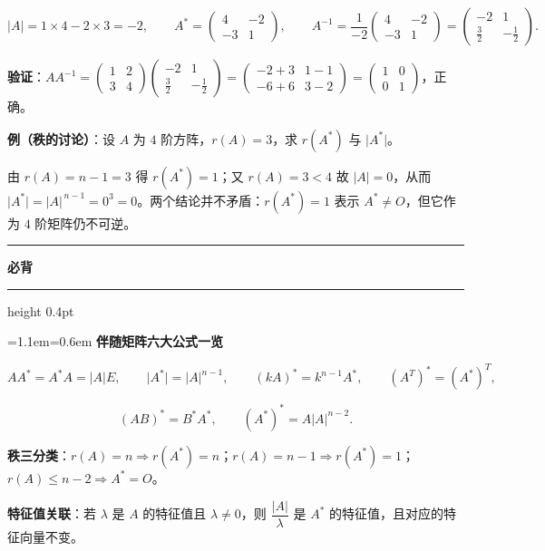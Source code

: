\documentclass[11pt,openany,UTF8]{ctexbook}
\newcommand{\callouthead}[2]{%
  \par\addvspace{7pt}\noindent
  {\color{#1}\rule[-0.15em]{3pt}{1.05em}}\hspace{0.5em}%
  {\bfseries\color{#1}#2}\par\nobreak\vspace{-0.35em}%
  {\color{rulesep}\hrule height 0.4pt}\nobreak\vspace{0.45em}%
  \begingroup\small\setlength{\parindent}{0pt}%
  \leftskip=1.1em\rightskip=0.6em\noindent\ignorespaces}
\newcommand{\calloutend}{\par\endgroup\addvspace{7pt}}
\newenvironment{callkey}[1]{\callouthead{keybar}{#1}}{\calloutend}
\begin{document}
\[\vert A\vert=1\times4-2\times3=-2,\qquad A^*=\begin{pmatrix}4&-2\\-3&1\end{pmatrix},\qquad A^{-1}=\frac{1}{-2}\begin{pmatrix}4&-2\\-3&1\end{pmatrix}=\begin{pmatrix}-2&1\\\frac{3}{2}&-\frac{1}{2}\end{pmatrix}.\]

\textbf{验证}：$AA^{-1}=\begin{pmatrix}1&2\\3&4\end{pmatrix}\begin{pmatrix}-2&1\\\frac32&-\frac12\end{pmatrix}=\begin{pmatrix}-2+3&1-1\\-6+6&3-2\end{pmatrix}=\begin{pmatrix}1&0\\0&1\end{pmatrix}$，正确。

\textbf{例（秩的讨论）}：设 $A$ 为 $4$ 阶方阵，$r(A)=3$，求 $r(A^*)$ 与 $\vert A^*\vert$。

由 $r(A)=n-1=3$ 得 $r(A^*)=1$；又 $r(A)=3<4$ 故 $\vert A\vert=0$，从而 $\vert A^*\vert=\vert A\vert^{\,n-1}=0^3=0$。两个结论并不矛盾：$r(A^*)=1$ 表示 $A^*\ne O$，但它作为 $4$ 阶矩阵仍不可逆。

\begin{callkey}{必背}
\textbf{伴随矩阵六大公式一览}

\[AA^*=A^*A=\vert A\vert E,\qquad \vert A^*\vert=\vert A\vert^{n-1},\qquad (kA)^*=k^{n-1}A^*,\qquad (A^T)^*=(A^*)^T,\]

\[(AB)^*=B^*A^*,\qquad (A^*)^*=A\vert A\vert^{n-2}.\]

\textbf{秩三分类}：$r(A)=n\Rightarrow r(A^*)=n$；$r(A)=n-1\Rightarrow r(A^*)=1$；$r(A)\le n-2\Rightarrow A^*=O$。

\textbf{特征值关联}：若 $\lambda$ 是 $A$ 的特征值且 $\lambda\ne0$，则 $\dfrac{\vert A\vert}{\lambda}$ 是 $A^*$ 的特征值，且对应的特征向量不变。

\end{callkey}
\end{document}
